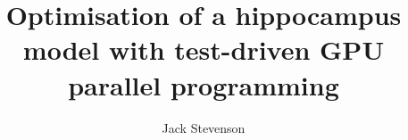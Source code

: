 \author{Jack Stevenson}

\title{\bfseries Optimisation of a hippocampus model with test-driven GPU parallel programming}

